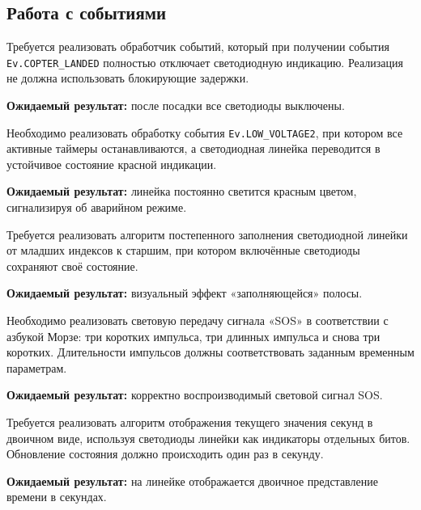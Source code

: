 \subsection{Работа с событиями}

\begin{taskbox}
Требуется реализовать обработчик событий, который при получении события \verb|Ev.COPTER_LANDED| полностью отключает светодиодную индикацию. Реализация не должна использовать блокирующие задержки.

\textbf{Ожидаемый результат:} после посадки все светодиоды выключены.
\end{taskbox}

\begin{taskbox}
Необходимо реализовать обработку события \verb|Ev.LOW_VOLTAGE2|, при котором все активные таймеры останавливаются, а светодиодная линейка переводится в устойчивое состояние красной индикации.

\textbf{Ожидаемый результат:} линейка постоянно светится красным цветом, сигнализируя об аварийном режиме.
\end{taskbox}

\begin{taskbox}
Требуется реализовать алгоритм постепенного заполнения светодиодной линейки от младших индексов к старшим, при котором включённые светодиоды сохраняют своё состояние.

\textbf{Ожидаемый результат:} визуальный эффект «заполняющейся» полосы.
\end{taskbox}

\begin{taskbox}
Необходимо реализовать световую передачу сигнала «SOS» в соответствии с азбукой Морзе: три коротких импульса, три длинных импульса и снова три коротких. Длительности импульсов должны соответствовать заданным временным параметрам.

\textbf{Ожидаемый результат:} корректно воспроизводимый световой сигнал SOS.
\end{taskbox}

\begin{taskbox}
Требуется реализовать алгоритм отображения текущего значения секунд в двоичном виде, используя светодиоды линейки как индикаторы отдельных битов. Обновление состояния должно происходить один раз в секунду.

\textbf{Ожидаемый результат:} на линейке отображается двоичное представление времени в секундах.
\end{taskbox}
